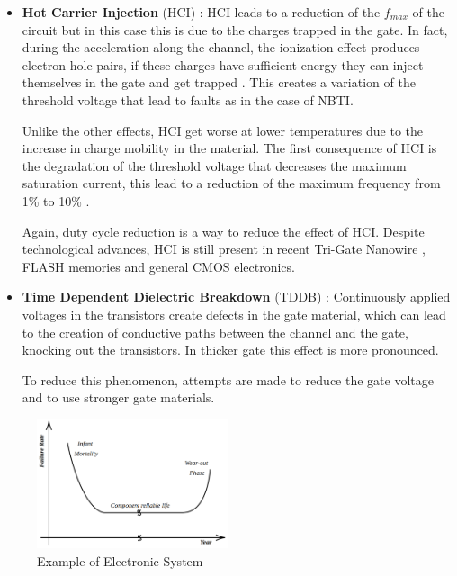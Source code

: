 {{{\begin{itemize}
				\item \textbf{Hot Carrier Injection} (HCI) : HCI leads to a reduction of the $f_{max}$ of the circuit but in this case  this is due to the charges trapped in the gate. In fact, during the acceleration along the channel, the ionization effect produces electron-hole pairs, if these charges have sufficient energy they can inject themselves in the gate and get trapped . This creates a variation of the threshold voltage that lead to faults as in the case of NBTI.
				
				Unlike the other effects, HCI get worse at lower temperatures due to the increase in charge mobility in the material. The first consequence of HCI is the degradation of the threshold voltage that decreases the maximum saturation current, this lead to a reduction of the maximum frequency from 1\% to 10\% .
				
				Again, duty cycle reduction is a way to reduce the effect of HCI. Despite technological advances, HCI is still present in recent Tri-Gate Nanowire , FLASH memories  and general CMOS electronics.
				
				\item \textbf{Time Dependent Dielectric Breakdown} (TDDB) : Continuously applied voltages in the transistors create defects in the gate material, which can lead to the creation of conductive paths between the channel and the gate, knocking out the transistors. In thicker gate this effect is more pronounced.
				
				To reduce this phenomenon, attempts are made to reduce the gate voltage and to use stronger gate materials.
				
			\end{itemize}
			
			
			\begin{figure}
				\includegraphics[width=0.5\textwidth]{./images/ComponentLife.png}
				\caption{Example of Electronic System}
				\label{fig:ComponentLife}
			\end{figure} 
		
}}}
